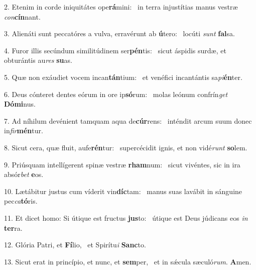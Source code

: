 2. Etenim in corde iniquitátes ope\textbf{rá}mini: \ast\  in terra injustítias manus vestræ \textit{con}\textbf{cín}nant.\

3. Alienáti sunt peccatóres a vulva, erravérunt ab \textbf{ú}tero: \ast\  locúti \textit{sunt} \textbf{fal}sa.\

4. Furor illis secúndum similitúdinem ser\textbf{pén}tis: \ast\  sicut áspidis surdæ, et obturántis au\textit{res} \textbf{su}as.\

5. Quæ non exáudiet vocem incan\textbf{tán}tium: \ast\  et venéfici incantántis sa\textit{pi}\textbf{én}ter.\

6. Deus cónteret dentes eórum in ore ip\textbf{só}rum: \ast\  molas leónum confrín\textit{get} \textbf{Dó}\textbf{mi}nus.\

7. Ad níhilum devénient tamquam aqua de\textbf{cúr}rens: \ast\  inténdit arcum suum donec in\textit{fir}\textbf{mén}tur.\

8. Sicut cera, quæ fluit, aufe\textbf{rén}tur: \ast\  supercécidit ignis, et non vidé\textit{runt} \textbf{so}lem.\

9. Priúsquam intellígerent spinæ vestræ \textbf{rham}num: \ast\  sicut vivéntes, sic in ira absór\textit{bet} \textbf{e}os.\

10. Lætábitur justus cum víderit vin\textbf{díc}tam: \ast\  manus suas lavábit in sánguine pec\textit{ca}\textbf{tó}ris.\

11. Et dicet homo: Si útique est fructus \textbf{jus}to: \ast\  útique est Deus júdicans eos \textit{in} \textbf{ter}ra.\

12. Glória Patri, et \textbf{Fí}lio, \ast\  et Spirítu\textit{i} \textbf{Sanc}to.\

13. Sicut erat in princípio, et nunc, et \textbf{sem}per, \ast\  et in sǽcula sæculó\textit{rum}. \textbf{A}men.\

